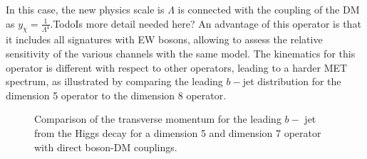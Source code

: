 In this case, the new physics scale is $\Lambda$ is connected with the coupling
of the DM as $y_{\chi} = \frac{1}{\Lambda^{4}}$.Todo{Is more detail needed here?}
An advantage of this operator is that it includes all signatures with EW bosons,
allowing to assess the relative sensitivity of the various channels with the same model.  
The kinematics for this operator is different with respect to other operators,
leading to a harder MET spectrum, 
as illustrated by comparing the leading $b-$jet distribution for the dimension 5 operator
to the dimension 8 operator. 
  
   \begin{figure}[hbpt!]
   	\centering
   	\hfill
   	\caption{Comparison of the transverse momentum for the leading $b-$ jet from the Higgs decay for a dimension 5 and dimension 7 operator
   		with direct boson-DM couplings.}
   	\end{figure}
   	

